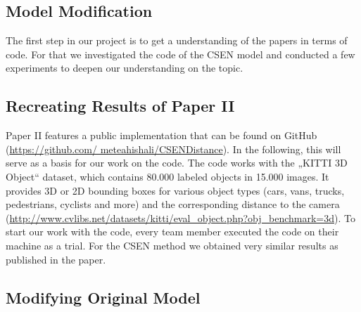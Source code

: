 \documentclass[a4paper, 11pt]{article}
\begin{document}
\begin{multicols}{2}
\section{Model Modification}
\begin{flushleft}
The first step in our project is to get a understanding of the papers in terms of code. For that we investigated the code of the CSEN model and conducted a few experiments to deepen our understanding on the topic.
\end{flushleft}

\subsection{Recreating Results of Paper II}
\begin{flushleft}
Paper II features a public implementation that can be found on GitHub (\url{https://github.com/ meteahishali/CSENDistance}). In the following, this will serve as a basis for our work on the code. The code works with the „KITTI 3D Object“ dataset, which contains 80.000 labeled objects in 15.000 images. It provides 3D or 2D bounding boxes for various object types (cars, vans, trucks, pedestrians, cyclists and more) and the corresponding distance to the camera (\url{http://www.cvlibs.net/datasets/kitti/eval_object.php?obj_benchmark=3d}).
To start our work with the code, every team member executed the code on their machine as a trial. For the CSEN method we obtained very similar results as published in the paper.
\end{flushleft}

\subsection{Modifying Original Model}


\end{multicols}
\end{document}
